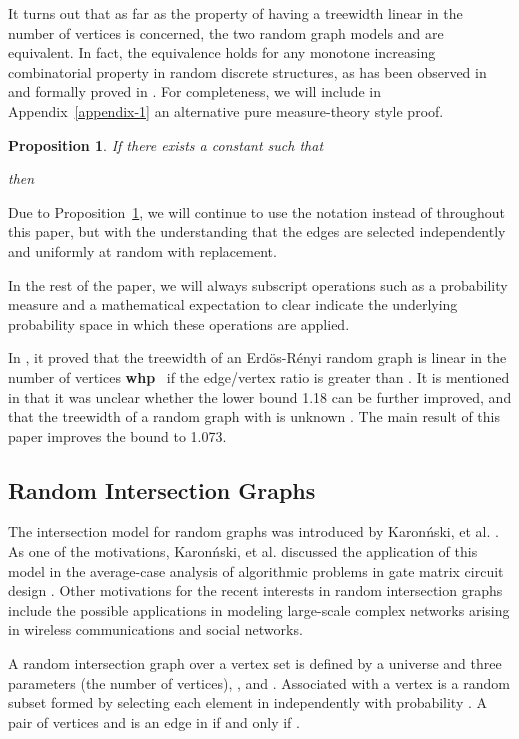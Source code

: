 \documentclass[11pt]{article}
\newtheorem{proposition}{Proposition}[section]
\providecommand{\whp}{\textbf{whp}}
\begin{document}
It turns out that as far as the property of having a treewidth linear in the number of vertices is concerned, the two random graph models   and 
 are equivalent. In fact, the equivalence holds for any monotone increasing combinatorial property in random discrete structures,    
as has been observed in \cite{kirousis94threshold,achlioptas99thesis} and formally proved in \cite{kirousis96tech}. For completeness, we will include in Appendix~\ref{appendix-1} an alternative pure measure-theory style proof.   
\begin{proposition}
\label{prop-equiv}
If there exists a constant  such that

then
 
\end{proposition}
Due to Proposition~\ref{prop-equiv}, we will continue to use the notation  
instead of  throughout this paper, but with the understanding that the  edges are selected independently and uniformly at random with replacement.


In the rest of the paper, we will always subscript operations such as 
a probability measure  and a mathematical 
expectation  to clear indicate the underlying probability space in which these operations are applied. 
 
In \cite{kloks94}, it proved that the treewidth of an Erd\"{o}s-R\'{e}nyi random 
graph  is linear in the number of vertices \whp~  if the edge/vertex ratio is
greater than .  It is mentioned
in \cite{kloks94} that it was unclear whether the lower bound 1.18 can 
be further improved, and that
the treewidth of a random graph  with 
is unknown \cite{kloks94}.  The main result of this paper improves
the bound to 1.073. 



\subsection{Random Intersection Graphs}
The intersection model for random graphs was introduced by Karon\'{n}ski, et al. \cite{karonski99cpc}. As one of the motivations, Karon\'{n}ski, et al. discussed 
the application of this model in the average-case analysis of algorithmic problems
in gate matrix circuit design \cite{karonski99cpc}.  Other motivations for the recent interests in random intersection graphs include the possible applications in modeling 
large-scale complex networks arising in wireless communications \cite{nikoletseas08tcs} 
and social networks. 

A random intersection graph  over a vertex set  is defined  
by a universe  and  three parameters  (the number of vertices), 
, and 
. Associated with a vertex  is a random subset  formed 
by selecting each element in  independently with probability . A pair of vertices 
and  is an edge in  if and only if .   
\end{document}
